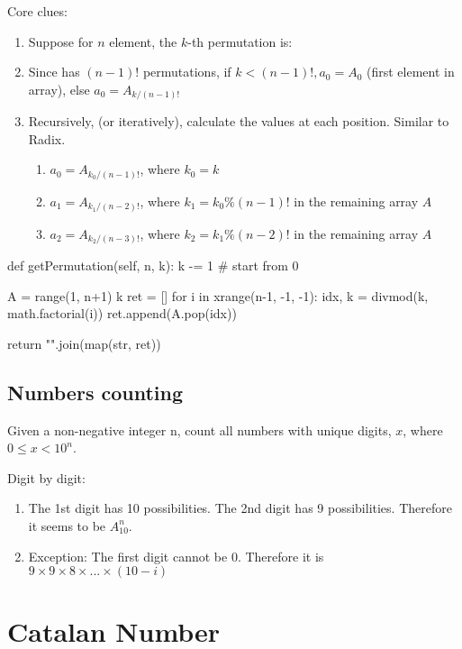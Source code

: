 Core clues:
\begin{enumerate}
\item {}

Suppose for $n$ element, the $k$-th permutation is:

\item {} Since \pyinline{[a1, a3, ..., an-1]} has $(n-1)!$ permutations,
if $k < (n-1)!, a_0 = A_0$ (first element in array), else $a_0 = A_{k/(n-1)!}$

\item Recursively, (or iteratively), calculate the values at each position. Similar to Radix. 
\begin{enumerate}
\item $a_0 = A_{k_0/(n-1)!}$, where $k_0 = k$
\item $a_1 = A_{k_1/(n-2)!}$, where $k_1 = k_0\%(n-1)!$ in the remaining array $A$
\item $a_2 = A_{k_2/(n-3)!}$, where $k_2 = k_1\%(n-2)!$ in the remaining array $A$
\end{enumerate}
\end{enumerate}
\begin{python}
def getPermutation(self, n, k):
    k -= 1  # start from 0

    A = range(1, n+1)
    k %
    ret = []
    for i in xrange(n-1, -1, -1):
        idx, k = divmod(k, math.factorial(i))
        ret.append(A.pop(idx))

    return "".join(map(str, ret))
\end{python}

\subsection{Numbers counting}
 Given a non-negative integer n, count all numbers with unique digits, $x$, where $0 \leq x < 10^n$.

Digit by digit: 
\begin{enumerate}
\item The 1st digit has 10 possibilities. The 2nd digit has 9 possibilities. Therefore it seems to be $A_{10}^n$.
\item Exception: The first digit cannot be 0. Therefore it is $9\times 9\times 8\times ...\times (10-i)$
\end{enumerate}



\section{Catalan Number}\label{section:catalanNumber}
